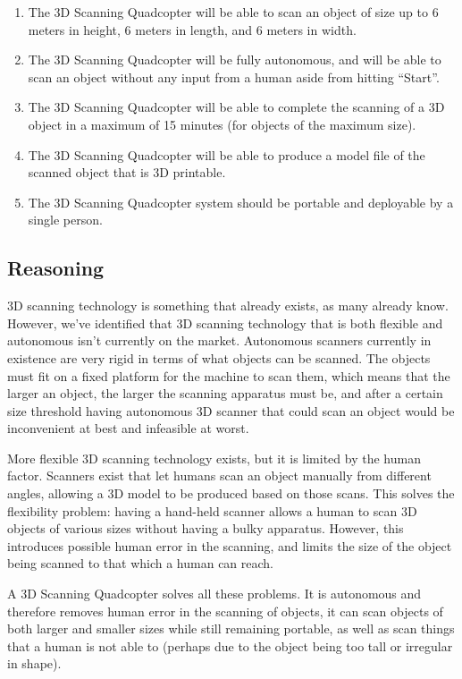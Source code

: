 \documentclass[10pt,letterpaper]{article}
\begin{document}
\begin{enumerate}
	\item The 3D Scanning Quadcopter will be able to scan an object of size up to 6 meters in height, 6 meters in length, and 6 meters in width. 
	\item The 3D Scanning Quadcopter will be fully autonomous, and will be able to scan an object without any input from a human aside from hitting ``Start''. 
	\item The 3D Scanning Quadcopter will be able to complete the scanning of a 3D object in a maximum of 15 minutes (for objects of the maximum size). 
	\item The 3D Scanning Quadcopter will be able to produce a model file of the scanned object that is 3D printable.
	\item The 3D Scanning Quadcopter system should be portable and deployable by a single person.
\end{enumerate}

\subsection{Reasoning}
3D scanning technology is something that already exists, as many already know. However, we've identified that 3D scanning technology that is both flexible and autonomous isn't currently on the market. Autonomous scanners currently in existence are very rigid in terms of what objects can be scanned. The objects must fit on a fixed platform for the machine to scan them, which means that the larger an object, the larger the scanning apparatus must be, and after a certain size threshold having autonomous 3D scanner that could scan an object would be inconvenient at best and infeasible at worst. \par 

More flexible 3D scanning technology exists, but it is limited by the human factor. Scanners exist that let humans scan an object manually from different angles, allowing a 3D model to be produced based on those scans. This solves the flexibility problem: having a hand-held scanner allows a human to scan 3D objects of various sizes without having a bulky apparatus. However, this introduces possible human error in the scanning, and limits the size of the object being scanned to that which a human can reach. \par 

A 3D Scanning Quadcopter solves all these problems. It is autonomous and therefore removes human error in the scanning of objects, it can scan objects of both larger and smaller sizes while still remaining portable, as well as scan things that a human is not able to (perhaps due to the object being too tall or irregular in shape).
\end{document}
